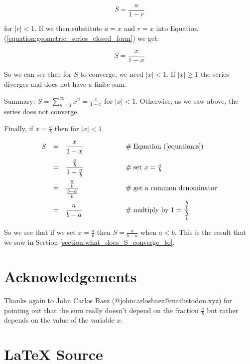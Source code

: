 \documentclass{article}
\theoremstyle{definition}
\begin{document}
\begin{equation}
S = \frac{a}{1 - r}
\label{equation:geometric_series_closed_form}
\end{equation}

\smallskip
\noindent
for $|r| < 1$. If we then substitute $a = x$ and $r = x$ into Equation 
(\ref{equation:geometric_series_closed_form}) we get:

\begin{equation}
S = \frac{x}{1 - x}
\label{equation:s}
\end{equation}

\medskip
\noindent
So we can see that for $S$ to converge, we need $|x| <
1$. If $|x| \geq 1$ the series diverges and does not have a
finite sum.

\bigskip
\noindent
Summary: $S = \sum\limits_{n=1}^{\infty} x^n = \frac{x}{1 - x}$
for $|x| < 1$. Otherwise, as we saw above, the series does not
converge.

\bigskip
\noindent
Finally, if $x = \frac{a}{b}$ then for $|x| < 1$

\begin{equation*}
\begin{array}{lllll}
S 
&=& \dfrac{x}{1 - x} 						&\hspace{5em} \mathrel{\#} \text{Equation (\ref{equation:s})} \\ 
[12pt]
&=& \dfrac{\frac{a}{b}}{1 - \frac{a}{b}}	&\hspace{5em} \mathrel{\#} \text{set $x = \frac{a}{b}$} \\ 
[12pt]
&=& \dfrac{\frac{a}{b}}{\frac{b -a}{b}} 	&\hspace{5em} \mathrel{\#} \text{get a common denominator} \\ 
[12pt]
&=& \dfrac{a}{b-a} 							&\hspace{5em} \mathrel{\#} \text{multiply by $1 = \dfrac{\frac{b}{1}}{\frac{b}{1}}$} \\ 
\end{array}
\end{equation*}

\medskip
\noindent
So we see that if we set $x = \frac{a}{b}$ then $S = \frac{a}{b-a}$ when $a < b$. 
This is the result that we saw in Section \ref{section:what_does_S_converge_to}.


%
%
%
%
\section*{Acknowledgements}
Thanks again to John Carlos Baez (@johncarlosbaez@mathstodon.xyz)
for pointing out that the sum really doesn't depend on the
fraction $\frac{a}{b}$ but rather depends on the value of the
variable $x$.
%
%
\section*{\LaTeX \hspace{0.10 mm} Source}
%
%
%


%
%
\end{document}
